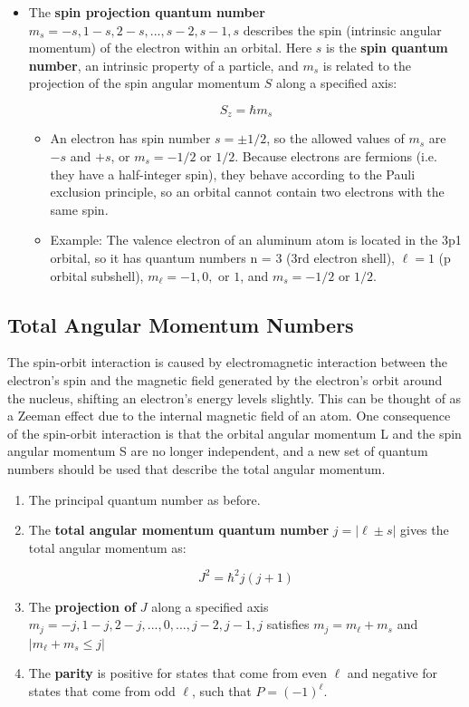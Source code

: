 \documentclass{article}
\newcommand{\be}{\begin{equation}}
\newcommand{\ee}{\end{equation}}
\begin{document}
\begin{itemize}
    \item The \textbf{spin projection quantum number} $m_s = - s,1 - s,2 - s,...,s - 2,s - 1,s$ describes the spin (intrinsic angular momentum) of the electron within an orbital. Here $s$ is the \textbf{spin quantum number}, an intrinsic property of a particle, and $m_s$ is related to the projection of the spin angular momentum $S$ along a specified axis:
    
    \be
    S_z = \hbar m_s
    \ee
    \begin{itemize}
        \item An electron has spin number $s = \pm 1/2$, so the allowed values of $m_s$ are $-s$ and $+s$, or $m_s = - 1 / 2$ or $1 / 2$. Because electrons are fermions (i.e. they have a half-integer spin), they behave according to the Pauli exclusion principle, so an orbital cannot contain two electrons with the same spin. 
        
        \item Example: The valence electron of an aluminum atom is located in the 3p1 orbital, so it has quantum numbers n = 3 (3rd electron shell), $\ell = 1$ (p orbital subshell), $m_\ell = -1, 0,$ or $1$, and $m_s = - 1 / 2$ or $1 / 2.$

    \end{itemize}
\end{itemize}


\subsection{Total Angular Momentum Numbers}

The spin-orbit interaction is caused by electromagnetic interaction between the electron's spin and the magnetic field generated by the electron's orbit around the nucleus, shifting an electron's energy levels slightly. This can be thought of as a Zeeman effect due to the internal magnetic field of an atom. One consequence of the spin-orbit interaction is that the orbital angular momentum L and the spin angular momentum S are no longer independent, and a new set of quantum numbers should be used that describe the total angular momentum.

\begin{enumerate}
    \item The principal quantum number as before.
    
    \item The \textbf{total angular momentum quantum number} $j = |\ell \pm s|$ gives the total angular momentum as:

\be
J^2 = \hbar^2 j(j+1)
\ee

    \item The \textbf{projection of} $J$ along a specified axis $m_j = - j,1 - j,2 - j,...,0,...,j - 2,j - 1,j$ satisfies $m_j = m_\ell + m_s$ and $|m_\ell + m_s \leq j|$
    
    \item The \textbf{parity} is positive for states that come from even $\ell$ and negative for states that come from odd $\ell$, such that $P = (-1)^\ell$.
\end{enumerate}
\end{document}
